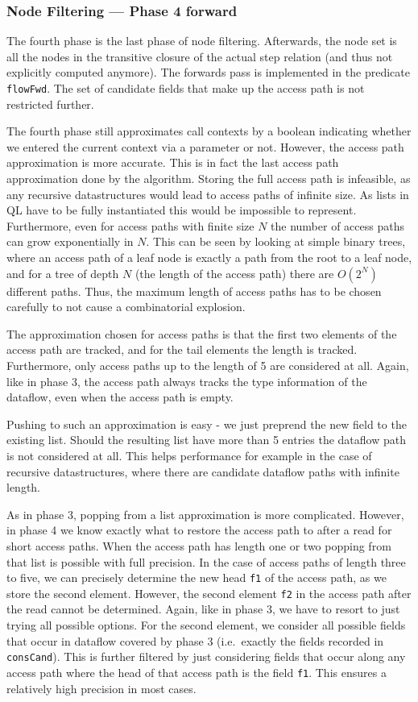 \subsubsection*{Node Filtering --- Phase 4 forward}
The fourth phase is the last phase of node filtering.
Afterwards, the node set is all the nodes in the transitive closure of 
the actual step relation (and thus not explicitly computed anymore).
The forwards pass is implemented in the predicate \texttt{flowFwd}.
The set of candidate fields that make up the access path is not
restricted further.

The fourth phase still approximates call contexts by a boolean indicating 
whether we entered the current context via a parameter or not.
However, the access path approximation is more accurate.
This is in fact the last access path approximation done by the algorithm.
Storing the full access path is infeasible, as any recursive datastructures
would lead to access paths of infinite size.
As lists in QL have to be fully instantiated this would be impossible to 
represent.
Furthermore, even for access paths with finite size $N$ the number of access paths 
can grow exponentially in $N$.
This can be seen by looking at simple binary trees, where an access path 
of a leaf node is exactly a path from the root to a leaf node, and for a tree
of depth $N$ (the length of the access path) there are $O(2^N)$ different paths.
Thus, the maximum length of access paths has to be chosen carefully to not 
cause a combinatorial explosion.

The approximation chosen for access paths is that the first two elements of
the access path are tracked, and for the tail elements the length is tracked.
Furthermore, only access paths up to the length of 5 are considered at all.
Again, like in phase 3, the access path always tracks the type information of the 
dataflow, even when the access path is empty.

Pushing to such an approximation is easy - we just preprend the new field to the 
existing list.
Should the resulting list have more than 5 entries the dataflow path is not considered
at all.
This helps performance for example in the case of recursive datastructures,
where there are candidate dataflow paths with infinite length.

As in phase 3, popping from a list approximation is more complicated.
However, in phase 4 we know exactly
what to restore the access path to after a read for short access paths.
When the access path has length one or two popping from that list 
is possible with full precision.
In the case of access paths of length three to five, we can precisely determine 
the new head \texttt{f1} of the access path, as we store the second element.
However, the second element \texttt{f2} in the access path after the read cannot be determined.
Again, like in phase 3, we have to resort to just trying all possible options.
For the second element, we consider all possible fields that occur in dataflow
covered by phase 3 (i.e.\ exactly the fields recorded in \texttt{consCand}).
This is further filtered by just considering fields that occur along any access path
where the head of that access path is the field \texttt{f1}.
This ensures a relatively high precision in most cases.


